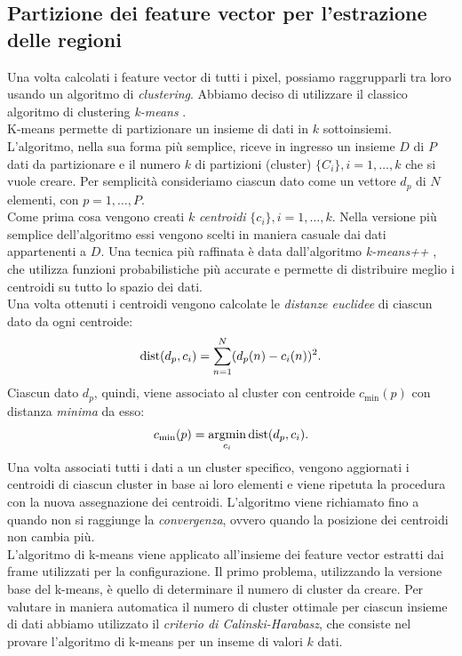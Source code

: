 \subsection{Partizione dei feature vector per l'estrazione delle regioni}
Una volta calcolati i feature vector di tutti i pixel, possiamo raggrupparli tra loro usando un algoritmo di \textit{clustering}.
Abbiamo deciso di utilizzare il classico algoritmo di clustering \textit{k-means} \cite{han2006data}.\\
K-means permette di partizionare un insieme di dati in $k$ sottoinsiemi.
L'algoritmo, nella sua forma pi\`u semplice, riceve in ingresso un insieme $D$ di $P$ dati da partizionare e il numero $k$ di partizioni (cluster) $\{C_i\}, i=1,\dots,k$ che si vuole creare.
Per semplicit\`a consideriamo ciascun dato come un vettore $d_p$ di $N$ elementi, con $p = 1,\dots ,P$.\\
Come prima cosa vengono creati $k$ \textit{centroidi} $\{c_i\}, i=1,\dots,k$.
Nella versione pi\`u semplice dell'algoritmo essi vengono scelti in maniera casuale dai dati appartenenti a $D$.
Una tecnica pi\`u raffinata \`e data dall'algoritmo \textit{k-means++} \cite{arthur2007k}, che utilizza funzioni probabilistiche pi\`u accurate e permette di distribuire meglio i centroidi su tutto lo spazio dei dati.\\
Una volta ottenuti i centroidi vengono calcolate le \textit{distanze euclidee} di ciascun dato da ogni centroide:
\[\operatorname*{dist}(d_p,c_i)=\sum_{n=1}^{N}(d_p(n)-c_i(n))^2. \]
Ciascun dato $d_p$, quindi, viene associato al cluster con centroide $c_{\min}(p)$ con distanza \textit{minima} da esso:
\[c_{\min}(p) = \operatorname*{argmin}_{c_i} \operatorname*{dist}(d_p,c_i). \]
Una volta associati tutti i dati a un cluster specifico, vengono aggiornati i centroidi di ciascun cluster in base ai loro elementi e viene ripetuta la procedura con la nuova assegnazione dei centroidi.
L'algoritmo viene richiamato fino a quando non si raggiunge la \textit{convergenza}, ovvero quando la posizione dei centroidi non cambia pi\`u.\\
L'algoritmo di k-means viene applicato all'insieme dei feature vector estratti dai frame utilizzati per la configurazione.
Il primo problema, utilizzando la versione base del k-means, \`e quello di determinare il numero di cluster da creare.
Per valutare in maniera automatica il numero di cluster ottimale per ciascun insieme di dati  abbiamo utilizzato il \textit{criterio di Calinski-Harabasz}\cite{calinski1974dendrite}, che consiste nel provare l'algoritmo di k-means per un inseme di valori $k$ dati.
